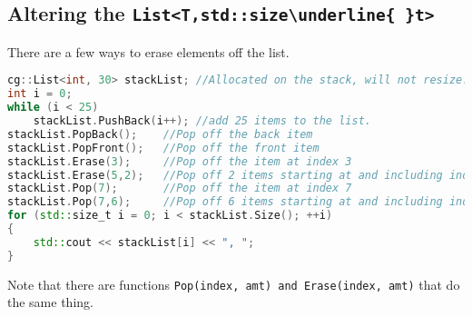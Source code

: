 \documentclass{article}
\newcommand{\theobj}{\protect\Verb+List<T,std::size\underline{ }t> +}
\begin{document}
\pagebreak
\subsection{Altering the \theobj}

There are a few ways to erase elements off the list.

\begin{lstlisting}[language=C++, label=code:2, caption=Erasing items]
cg::List<int, 30> stackList; //Allocated on the stack, will not resize.
int i = 0;
while (i < 25)
	stackList.PushBack(i++); //add 25 items to the list.
stackList.PopBack();    //Pop off the back item
stackList.PopFront();   //Pop off the front item
stackList.Erase(3);     //Pop off the item at index 3
stackList.Erase(5,2);   //Pop off 2 items starting at and including index 5
stackList.Pop(7);       //Pop off the item at index 7
stackList.Pop(7,6);     //Pop off 6 items starting at and including index 7
for (std::size_t i = 0; i < stackList.Size(); ++i)
{
	std::cout << stackList[i] << ", ";
}
\end{lstlisting}

Note that there are functions \Verb+Pop(index, amt) and Erase(index, amt)+ that do the same thing.
\end{document}
